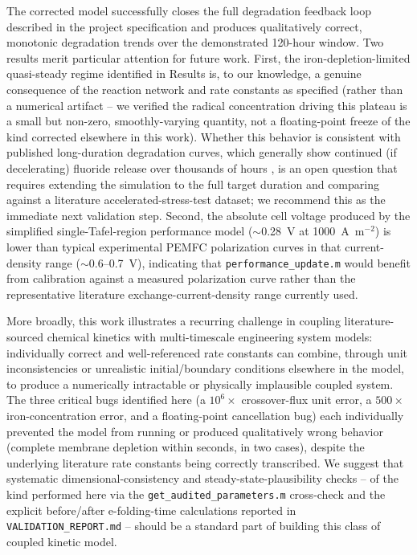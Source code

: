 \documentclass[10pt,twocolumn]{article}
\begin{document}
The corrected model successfully closes the full degradation feedback
loop described in the project specification and produces qualitatively
correct, monotonic degradation trends over the demonstrated 120-hour
window. Two results merit particular attention for future work. First,
the iron-depletion-limited quasi-steady regime identified in Results is,
to our knowledge, a genuine consequence of the reaction network and rate
constants as specified (rather than a numerical artifact -- we verified
the radical concentration driving this plateau is a small but non-zero,
smoothly-varying quantity, not a floating-point freeze of the kind
corrected elsewhere in this work). Whether this behavior is consistent
with published long-duration degradation curves, which generally show
continued (if decelerating) fluoride release over thousands of hours
\citep{kreuer2004}, is an open question that requires extending the
simulation to the full target duration and comparing against a
literature accelerated-stress-test dataset; we recommend this as the
immediate next validation step. Second, the absolute cell voltage
produced by the simplified single-Tafel-region performance model
($\sim$0.28~V at 1000~A~m$^{-2}$) is lower than typical experimental
PEMFC polarization curves in that current-density range ($\sim$0.6--0.7~V),
indicating that \texttt{performance\_update.m} would benefit from
calibration against a measured polarization curve rather than the
representative literature exchange-current-density range currently used.

More broadly, this work illustrates a recurring challenge in coupling
literature-sourced chemical kinetics with multi-timescale engineering
system models: individually correct and well-referenced rate constants
can combine, through unit inconsistencies or unrealistic initial/boundary
conditions elsewhere in the model, to produce a numerically intractable
or physically implausible coupled system. The three critical bugs
identified here (a $10^6\times$ crossover-flux unit error, a $500\times$
iron-concentration error, and a floating-point cancellation bug) each
individually prevented the model from running or produced qualitatively
wrong behavior (complete membrane depletion within seconds, in two
cases), despite the underlying literature rate constants being correctly
transcribed. We suggest that systematic dimensional-consistency and
steady-state-plausibility checks -- of the kind performed here via the
\texttt{get\_audited\_parameters.m} cross-check and the explicit
before/after e-folding-time calculations reported in
\texttt{VALIDATION\_REPORT.md} -- should be a standard part of building
this class of coupled kinetic model.
\end{document}
